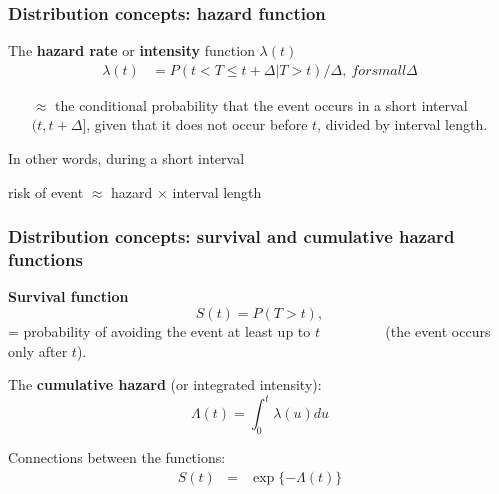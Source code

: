 \documentclass[handout,12pt,dvipsnames,t]{beamer}
\begin{document}
\begin{frame}[fragile]

\frametitle{Distribution concepts: hazard function}

The \textbf{hazard rate} or \textbf{intensity} function $\lambda(t)$
\begin{align*}
\lambda(t) & = 
 {P(t < T \le t+\Delta | T > t)}/{\Delta}, \ for small \Delta 
\end{align*}
\begin{itemize}
\item[$\approx$]  the conditional probability that
the event occurs in a short
 interval $(t, t+\Delta]$, given that it does not
occur before $t$, divided by interval length. 
\end{itemize}

In other words, during a short interval
 \begin{center}
 risk of event $\approx$ hazard $\times$ interval length 
 \end{center}

\end{frame}


\begin{frame}[fragile]
\frametitle{Distribution concepts: survival and cumulative hazard functions} 

\textbf{Survival function} 
\[ S(t) =  P( T  >  t) , \]
= probability of avoiding the event at least up to $t$
$\qquad\qquad{}$ (the event occurs
only after $t$).  

The \textbf{cumulative hazard} (or integrated intensity):
\[ \Lambda(t) = \int_0^t \lambda(u)du \]

\bigskip
Connections between the functions:
\begin{eqnarray*}
  S(t) & = & \exp\{ - \Lambda(t) \} 
\end{eqnarray*}



\end{frame}
\end{document}
